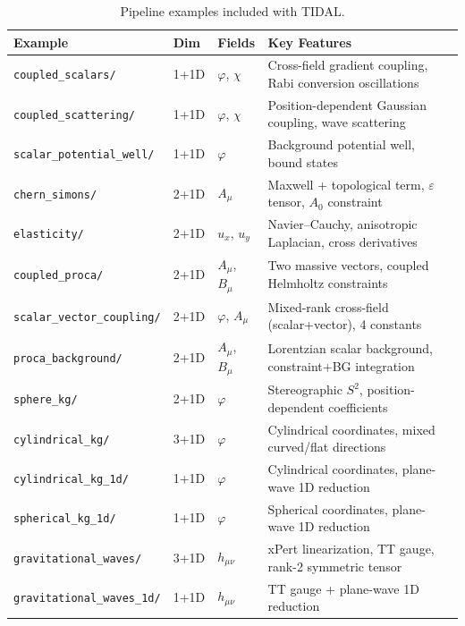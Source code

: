\begin{table}[htbp]
\centering
\caption{Pipeline examples included with TIDAL.}
\label{tab:pipeline-examples}
\begin{tabular}{@{}llll@{}}
\toprule
Example & Dim & Fields & Key Features \\
\midrule
\texttt{coupled\_scalars/}         & 1+1D & $\varphi$, $\chi$     & Cross-field gradient coupling, Rabi conversion oscillations \\
\texttt{coupled\_scattering/}      & 1+1D & $\varphi$, $\chi$     & Position-dependent Gaussian coupling, wave scattering \\
\texttt{scalar\_potential\_well/}  & 1+1D & $\varphi$             & Background potential well, bound states \\
\texttt{chern\_simons/}            & 2+1D & $A_\mu$               & Maxwell + topological term, $\varepsilon$ tensor, $A_0$ constraint \\
\texttt{elasticity/}               & 2+1D & $u_x$, $u_y$          & Navier--Cauchy, anisotropic Laplacian, cross derivatives \\
\texttt{coupled\_proca/}           & 2+1D & $A_\mu$, $B_\mu$      & Two massive vectors, coupled Helmholtz constraints \\
\texttt{scalar\_vector\_coupling/} & 2+1D & $\varphi$, $A_\mu$    & Mixed-rank cross-field (scalar+vector), 4 constants \\
\texttt{proca\_background/}        & 2+1D & $A_\mu$, $B_\mu$      & Lorentzian scalar background, constraint+BG integration \\
\texttt{sphere\_kg/}               & 2+1D & $\varphi$             & Stereographic $S^2$, position-dependent coefficients \\
\texttt{cylindrical\_kg/}          & 3+1D & $\varphi$             & Cylindrical coordinates, mixed curved/flat directions \\
\texttt{cylindrical\_kg\_1d/}      & 1+1D & $\varphi$             & Cylindrical coordinates, plane-wave 1D reduction \\
\texttt{spherical\_kg\_1d/}        & 1+1D & $\varphi$             & Spherical coordinates, plane-wave 1D reduction \\
\texttt{gravitational\_waves/}     & 3+1D & $h_{\mu\nu}$          & xPert linearization, TT gauge, rank-2 symmetric tensor \\
\texttt{gravitational\_waves\_1d/} & 1+1D & $h_{\mu\nu}$          & TT gauge + plane-wave 1D reduction \\

\end{tabular}
\end{table}
